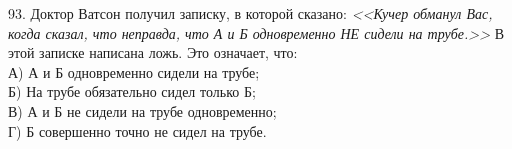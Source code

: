93. Доктор Ватсон получил записку, в которой сказано: {\it <<Кучер обманул Вас, когда сказал, что неправда, что А и Б одновременно НЕ сидели на трубе.>>} В этой записке написана ложь. Это означает, что:\\
А) А и Б одновременно сидели на трубе;\\
Б) На трубе обязательно сидел только Б;\\
В) А и Б не сидели на трубе одновременно;\\
Г) Б совершенно точно не сидел на трубе.\\
